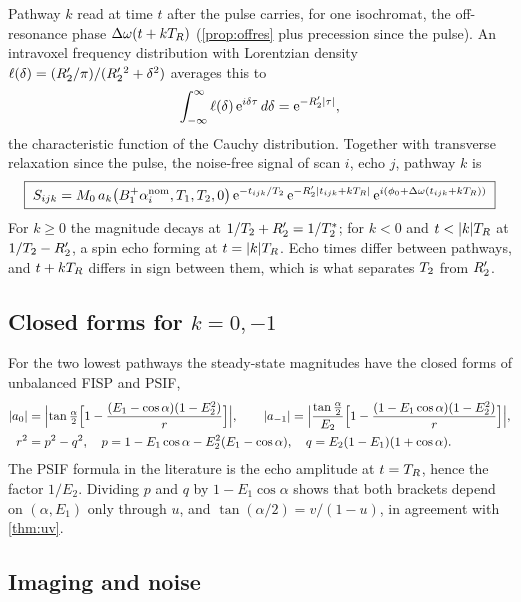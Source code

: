 Pathway $k$ read at time $t$ after the pulse carries, for one isochromat, the off-resonance
phase $\Delta\omega(t+kT_R)$ (\cref{prop:offres} plus precession since the pulse). An intravoxel
frequency distribution with Lorentzian density $\ell(\delta)=(R_2'/\pi)/(R_2'{}^2+\delta^2)$
averages this to
\begin{equation}
  \int_{-\infty}^{\infty}\ell(\delta)\,\mathrm{e}^{i\delta\tau}\,d\delta=\mathrm{e}^{-R_2'|\tau|},
  \label{eq:lorentz}
\end{equation}
the characteristic function of the Cauchy distribution. Together with transverse relaxation
since the pulse, the noise-free signal of scan $i$, echo $j$, pathway $k$ is
\begin{equation}
  \boxed{\;S_{ijk}=M_0\,a_k\bigl(B_1^{+}\alpha_i^{\rm nom},T_1,T_2,0\bigr)\,
  \mathrm{e}^{-t_{ijk}/T_2}\,\mathrm{e}^{-R_2'|t_{ijk}+kT_R|}\,
  \mathrm{e}^{i(\phi_0+\Delta\omega(t_{ijk}+kT_R))}\;}
  \label{eq:signal}
\end{equation}
For $k\ge0$ the magnitude decays at $1/T_2+R_2'=1/T_2^{*}$; for $k<0$ and $t<|k|\TR$ at
$1/T_2-R_2'$, a spin echo forming at $t=|k|T_R$. Echo times differ between pathways, and
$t+kT_R$ differs in sign between them, which is what separates $T_2$ from $R_2'$.

\subsection{Closed forms for $k=0,-1$}

For the two lowest pathways the steady-state magnitudes have the closed forms of unbalanced
FISP and PSIF,
\begin{align}
  |a_0|&=\Bigl|\tan\tfrac{\alpha}{2}\Bigl[1-\frac{(E_1-\cos\alpha)(1-E_2^2)}{r}\Bigr]\Bigr|,\qquad
  |a_{-1}|=\Bigl|\frac{\tan\frac{\alpha}{2}}{E_2}\Bigl[1-\frac{(1-E_1\cos\alpha)(1-E_2^2)}{r}\Bigr]\Bigr|,
  \label{eq:fisp}\\
  r^2&=p^2-q^2,\quad p=1-E_1\cos\alpha-E_2^2(E_1-\cos\alpha),\quad q=E_2(1-E_1)(1+\cos\alpha).
  \nonumber
\end{align}
The PSIF formula in the literature is the echo amplitude at $t=T_R$, hence the factor $1/E_2$.
Dividing $p$ and $q$ by $1-E_1\cos\alpha$ shows that both brackets depend on $(\alpha,E_1)$ only
through $u$, and $\tan(\alpha/2)=v/(1-u)$, in agreement with \cref{thm:uv}.

\subsection{Imaging and noise}

